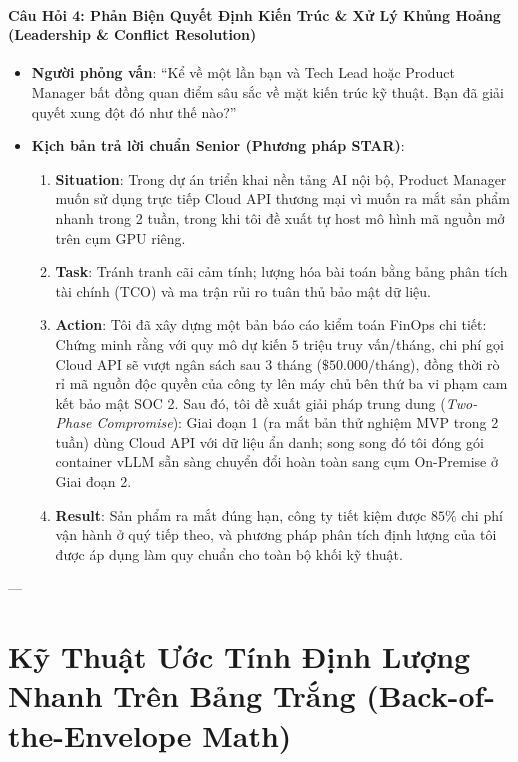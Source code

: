 \paragraph{Câu Hỏi 4: Phản Biện Quyết Định Kiến Trúc \& Xử Lý Khủng Hoảng (Leadership \& Conflict Resolution)}
\begin{itemize}
  \item \textbf{Người phỏng vấn}: ``Kể về một lần bạn và Tech Lead hoặc Product Manager bất đồng quan điểm sâu sắc về mặt kiến trúc kỹ thuật. Bạn đã giải quyết xung đột đó như thế nào?''
  \item \textbf{Kịch bản trả lời chuẩn Senior (Phương pháp STAR)}:
  \begin{enumerate}
    \item \textbf{Situation}: Trong dự án triển khai nền tảng AI nội bộ, Product Manager muốn sử dụng trực tiếp Cloud API thương mại vì muốn ra mắt sản phẩm nhanh trong 2 tuần, trong khi tôi đề xuất tự host mô hình mã nguồn mở trên cụm GPU riêng.
    \item \textbf{Task}: Tránh tranh cãi cảm tính; lượng hóa bài toán bằng bảng phân tích tài chính (TCO) và ma trận rủi ro tuân thủ bảo mật dữ liệu.
    \item \textbf{Action}: Tôi đã xây dựng một bản báo cáo kiểm toán FinOps chi tiết: Chứng minh rằng với quy mô dự kiến $5$ triệu truy vấn/tháng, chi phí gọi Cloud API sẽ vượt ngân sách sau 3 tháng ($\$50.000\text{/tháng}$), đồng thời rò rỉ mã nguồn độc quyền của công ty lên máy chủ bên thứ ba vi phạm cam kết bảo mật SOC 2. Sau đó, tôi đề xuất giải pháp trung dung (\textit{Two-Phase Compromise}): Giai đoạn 1 (ra mắt bản thử nghiệm MVP trong 2 tuần) dùng Cloud API với dữ liệu ẩn danh; song song đó tôi đóng gói container vLLM sẵn sàng chuyển đổi hoàn toàn sang cụm On-Premise ở Giai đoạn 2.
    \item \textbf{Result}: Sản phẩm ra mắt đúng hạn, công ty tiết kiệm được $85\%$ chi phí vận hành ở quý tiếp theo, và phương pháp phân tích định lượng của tôi được áp dụng làm quy chuẩn cho toàn bộ khối kỹ thuật.
  \end{enumerate}
\end{itemize}

---

\section{Kỹ Thuật Ước Tính Định Lượng Nhanh Trên Bảng Trắng (Back-of-the-Envelope Math)}
\label{sec:ch15-back-of-the-envelope}

